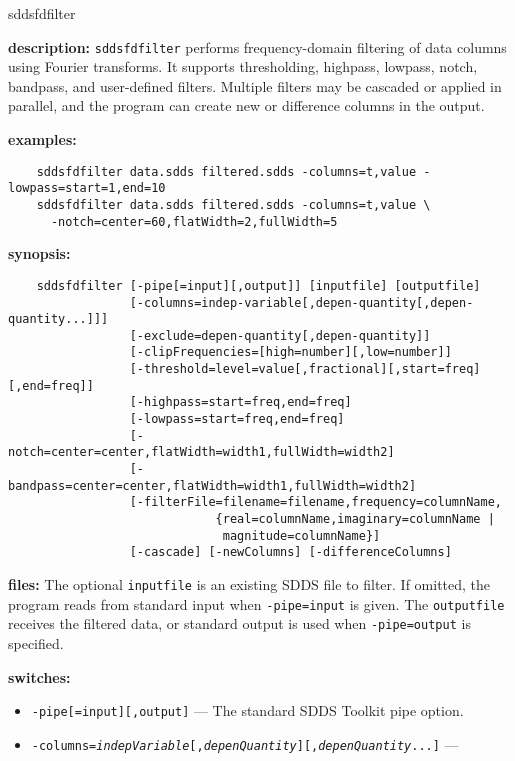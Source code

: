 \begin{sddsprog}{sddsfdfilter}
  \item \textbf{description:}
    \verb|sddsfdfilter| performs frequency-domain filtering of data columns using
    Fourier transforms.  It supports thresholding, highpass, lowpass, notch,
    bandpass, and user-defined filters.  Multiple filters may be cascaded or
    applied in parallel, and the program can create new or difference columns in
    the output.
  \item \textbf{examples:}
    \begin{verbatim}
    sddsfdfilter data.sdds filtered.sdds -columns=t,value -lowpass=start=1,end=10
    sddsfdfilter data.sdds filtered.sdds -columns=t,value \
      -notch=center=60,flatWidth=2,fullWidth=5
    \end{verbatim}
  \item \textbf{synopsis:}
    \begin{verbatim}
    sddsfdfilter [-pipe[=input][,output]] [inputfile] [outputfile]
                 [-columns=indep-variable[,depen-quantity[,depen-quantity...]]]
                 [-exclude=depen-quantity[,depen-quantity]]
                 [-clipFrequencies=[high=number][,low=number]]
                 [-threshold=level=value[,fractional][,start=freq][,end=freq]]
                 [-highpass=start=freq,end=freq]
                 [-lowpass=start=freq,end=freq]
                 [-notch=center=center,flatWidth=width1,fullWidth=width2]
                 [-bandpass=center=center,flatWidth=width1,fullWidth=width2]
                 [-filterFile=filename=filename,frequency=columnName,
                             {real=columnName,imaginary=columnName |
                              magnitude=columnName}]
                 [-cascade] [-newColumns] [-differenceColumns]
    \end{verbatim}
  \item \textbf{files:}
    The optional \verb|inputfile| is an existing SDDS file to filter.  If omitted,
    the program reads from standard input when \verb|-pipe=input| is given.  The
    \verb|outputfile| receives the filtered data, or standard output is used when
    \verb|-pipe=output| is specified.
  \item \textbf{switches:}
    \begin{itemize}
    \item {\tt -pipe[=input][,output]} --- The standard SDDS Toolkit pipe option.
    \item {\tt -columns={\em indepVariable}[,{\em depenQuantity}][,{\em depenQuantity}...]} ---

\end{itemize}
\end{sddsprog}
